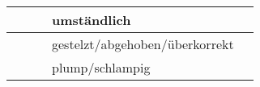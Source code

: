 \begin{longtable}{|l|l|l|l|l|l|}
     & \textbf{}          &            & \multicolumn{2}{l|}{umständlich}                            &                                                                                                                                                                                                                                                                                                                                                                                                                                                                                                                                                                                                                                                                                                         \\ \hline
     & \textbf{}          &            & \multicolumn{2}{l|}{gestelzt/abgehoben/überkorrekt}         &                                                                                                                                                                                                                                                                                                                                                                                                                                                                                                                                                                                                                                                                                                         \\ \hline
     & \textbf{}          &            & \multicolumn{2}{l|}{plump/schlampig}                        &                                                                                                                                                                                                                                                                                                                                                                                                                                                                                                                                                                                                                                                                                                         \\ \hline

\end{longtable}
